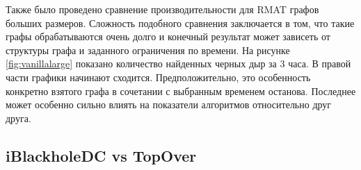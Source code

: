 \documentclass[12pt,a4paper,oneside,openany]{article}
\theoremstyle{definition}
\theoremstyle{lemma}
\theoremstyle{remark}
\begin{document}
Также было проведено сравнение производительности для RMAT графов больших размеров. Сложность подобного сравнения заключается в том,
что такие графы обрабатываются очень долго и конечный результат может зависеть от структуры графа и заданного ограничения по времени.
На рисунке \ref{fig:vanillalarge} показано количество найденных черных дыр за 3 часа. В правой части графики начинают сходится.
Предположительно, это особенность конкретно взятого графа в сочетании с выбранным временем останова. Последнее может особенно сильно влиять
на показатели алгоритмов относительно друг друга.

\subsection{iBlackholeDC vs TopOver}\label{subsec:topovercomparison}
\end{document}
